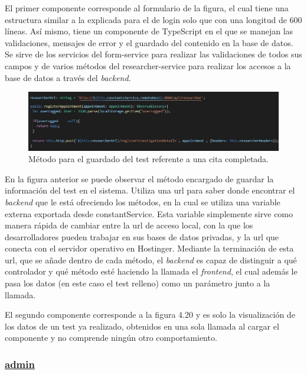     El primer componente corresponde al formulario de la figura, el cual tiene una estructura similar a la explicada para el de login solo que con una longitud de 600 líneas. Así mismo, tiene un componente de TypeScript en el que se manejan las validaciones, mensajes de error y el guardado del contenido en la base de datos. Se sirve de los servicios del form-service para realizar las validaciones de todos sus campos y de varios métodos del researcher-service para realizar los accesos a la base de datos a través del \textit{backend}.
    
    \begin{figure}[h]
    \centering
    \includegraphics[width=1\textwidth]{images/registerAppointment.jpg}
    \caption{Método para el guardado del test referente a una cita completada.}
    \end{figure}
    \FloatBarrier
    
    En la figura anterior se puede observar el método encargado de guardar la información del test en el sistema. Utiliza una url para saber donde encontrar el \textit{backend} que le está ofreciendo los métodos, en la cual se utiliza una variable externa exportada desde constantService. Esta variable simplemente sirve como manera rápida de cambiar entre la url de acceso local, con la que los desarrolladores pueden trabajar en sus bases de datos privadas, y la url que conecta con el servidor operativo en Hostinger. Mediante la terminación de esta url, que se añade dentro de cada método, el \textit{backend} es capaz de distinguir a qué controlador y qué método esté haciendo la llamada el \textit{frontend}, el cual además le pasa los datos (en este caso el test relleno) como un parámetro junto a la llamada.\newline
    
    El segundo componente corresponde a la figura 4.20 y es solo la visualización de los datos de un test ya realizado, obtenidos en una sola llamada al cargar el componente y no comprende ningún otro comportamiento.\newpage
    
    \subsubsection{\underline{admin}}
    
